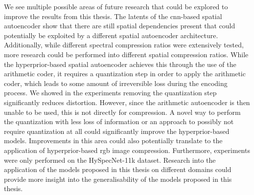 We see multiple possible areas of future research that could be explored to improve the results from this thesis. The latents of the \ac{cnn}-based spatial autoencoder show that there are still spatial dependencies present that could potentially be exploited by a different spatial autoencoder architecture. Additionally, while different spectral compression ratios were extensively tested, more research could be performed into different spatial compression ratios. While the hyperprior-based spatial autoencoder achieves this through the use of the arithmetic coder, it requires a quantization step in order to apply the arithmetic coder, which leads to some amount of irreversible loss during the encoding process. We showed in the experiments removing the quantization step significantly reduces distortion. However, since the arithmetic autoencoder is then unable to be used, this is not directly for compression. A novel way to perform the quantization with less loss of information or an approach to possibly not require quantization at all could significantly improve the hyperprior-based models. Improvements in this area could also potentially translate to the application of hyperprior-based \ac{rgb} image compression. Furthermore, experiments were only performed on the HySpecNet-11k dataset. Research into the application of the models proposed in this thesis on different domains could provide more insight into the generalisability of the models proposed in this thesis. 
